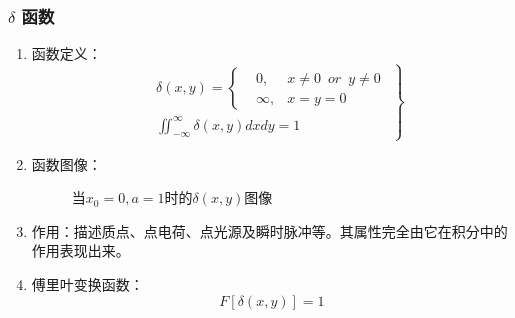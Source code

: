 \documentclass[twocolumn]{ctexart}
\begin{document}
\subsubsection{$\delta $ 函数}
\begin{enumerate}
    \item 函数定义：
          \begin{equation}
              \left.
              \begin{aligned}
                   & \delta \left( x,y \right) = \left\{
                  \begin{aligned}
                       & 0,      & x\neq0\enspace or\enspace y\neq0 \\
                       & \infty, & x=y=0
                      \nonumber
                  \end{aligned}
                  \right.                                                    \\
                   & \iint ^{\infty} _{-\infty} \delta\left(x,y\right)dxdy=1
              \end{aligned}
              \right\}
          \end{equation}
    \item
          函数图像：
          \begin{figure}[H]
              \caption{当$x_0=0,a=1$时的$\delta \left( x,y \right)$图像}
          \end{figure}
    \item
          作用：描述质点、点电荷、点光源及瞬时脉冲等。其属性完全由它在积分中的作用表现出来。
    \item
          傅里叶变换函数：
          \begin{equation}
              F\left[ \delta\left(x,y\right) \right]=1
              \nonumber
          \end{equation}
\end{enumerate}
\end{document}
